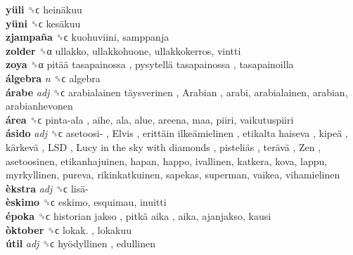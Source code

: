 \textbf{yüli} ␝ϲ   heinäkuu   \\
\textbf{yüni} ␝ϲ   kesäkuu   \\
\textbf{zjampaña} ␝ϲ  kuohuviini, samppanja  \\
\textbf{zolder} ␝α  ullakko, ullakkohuone, ullakkokerros, vintti  \\
\textbf{zoya} ␝α   pitää tasapainossa ,  pysytellä tasapainossa , tasapainoilla  \\
\textbf{álgebra} \emph{n}  ␝ϲ  algebra  \\
\textbf{árabe} \emph{adj}  ␝ϲ   arabialainen täysverinen ,  Arabian , arabi, arabialainen, arabian, arabianhevonen  \\
\textbf{área} ␝ϲ   pinta-ala , aihe, ala, alue, areena, maa, piiri, vaikutuspiiri  \\
\textbf{ásido} \emph{adj}  ␝ϲ   asetoosi- ,  Elvis ,  erittäin ilkeämielinen ,  etikalta haiseva ,  kipeä ,  kärkevä ,  LSD ,  Lucy in the sky with diamonds ,  pisteliäs ,  terävä ,  Zen , asetoosinen, etikanhajuinen, hapan, happo, ivallinen, katkera, kova, lappu, myrkyllinen, pureva, rikinkatkuinen, sapekas, superman, vaikea, vihamielinen  \\
\textbf{èkstra} \emph{adj}  ␝ϲ   lisä-   \\
\textbf{èskimo} ␝ϲ  eskimo, esquimau, inuitti  \\
\textbf{époka} ␝ϲ   historian jakso ,  pitkä aika , aika, ajanjakso, kausi  \\
\textbf{òktober} ␝ϲ   lokak. , lokakuu  \\
\textbf{útil} \emph{adj}  ␝ϲ   hyödyllinen , edullinen  \\
